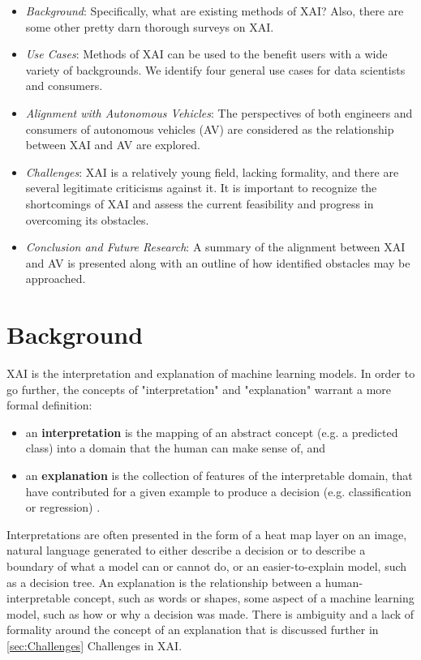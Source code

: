 \documentclass{IEEEtran}
\begin{document}
\begin{itemize}
    \item\textit{Background}: Specifically, what are existing methods of XAI?  Also, there are some other pretty darn thorough surveys on XAI.

    \item\textit{Use Cases}: Methods of XAI can be used to the benefit users with a wide variety of backgrounds.  We identify four general use cases for data scientists and consumers.

    \item\textit{Alignment with Autonomous Vehicles}: The perspectives of both engineers and consumers of autonomous vehicles (AV) are considered as the relationship between XAI and AV are explored.

    \item\textit{Challenges}: XAI is a relatively young field, lacking formality, and there are several legitimate criticisms against it.  It is important to recognize the shortcomings of XAI and assess the current feasibility and progress in overcoming its obstacles.

    \item\textit{Conclusion and Future Research}: A summary of the alignment between XAI and AV is presented along with an outline of how identified obstacles may be approached.
\end{itemize}

\section{Background}

XAI is the interpretation and explanation of machine learning models.  In order to go further, the concepts of "interpretation" and "explanation" warrant a more formal definition:

\begin{itemize}
    \item an \textbf{interpretation} is the mapping of an abstract concept (e.g. a predicted class) into a domain that the human can make sense of, and
    \item an \textbf{explanation} is the collection of features of the interpretable domain, that have contributed for a given example to produce a decision (e.g. classification or regression) \cite{MONTAVON20181}.
\end{itemize}

Interpretations are often presented in the form of a heat map layer on an image, natural language generated to either describe a decision or to describe a boundary of what a model can or cannot do, or an easier-to-explain model, such as a decision tree.  An explanation is the relationship between a human-interpretable concept, such as words or shapes, some aspect of a machine learning model, such as how or why a decision was made.  There is ambiguity and a lack of formality around the concept of an explanation that is discussed further in \ref{sec:Challenges} Challenges in XAI.
\end{document}
